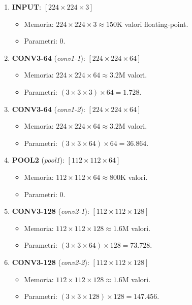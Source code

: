 ﻿\documentclass[11pt, a4paper]{article}
\begin{document}
\begin{enumerate}[noitemsep]
    \item \textbf{INPUT}: $[224 \times 224 \times 3]$
    \begin{itemize}
        \item Memoria: $224 \times 224 \times 3 \approx 150\text{K}$ valori floating-point.
        \item Parametri: $0$.
    \end{itemize}
    \item \textbf{CONV3-64} (\emph{conv1-1}): $[224 \times 224 \times 64]$
    \begin{itemize}
        \item Memoria: $224 \times 224 \times 64 \approx 3.2\text{M}$ valori.
        \item Parametri: $(3 \times 3 \times 3) \times 64 = 1.728$.
    \end{itemize}
    \item \textbf{CONV3-64} (\emph{conv1-2}): $[224 \times 224 \times 64]$
    \begin{itemize}
        \item Memoria: $224 \times 224 \times 64 \approx 3.2\text{M}$ valori.
        \item Parametri: $(3 \times 3 \times 64) \times 64 = 36.864$.
    \end{itemize}
    \item \textbf{POOL2} (\emph{pool1}): $[112 \times 112 \times 64]$
    \begin{itemize}
        \item Memoria: $112 \times 112 \times 64 \approx 800\text{K}$ valori.
        \item Parametri: $0$.
    \end{itemize}
    \item \textbf{CONV3-128} (\emph{conv2-1}): $[112 \times 112 \times 128]$
    \begin{itemize}
        \item Memoria: $112 \times 112 \times 128 \approx 1.6\text{M}$ valori.
        \item Parametri: $(3 \times 3 \times 64) \times 128 = 73.728$.
    \end{itemize}
    \item \textbf{CONV3-128} (\emph{conv2-2}): $[112 \times 112 \times 128]$
    \begin{itemize}
        \item Memoria: $112 \times 112 \times 128 \approx 1.6\text{M}$ valori.
        \item Parametri: $(3 \times 3 \times 128) \times 128 = 147.456$.

\end{itemize}
\end{enumerate}
\end{document}
